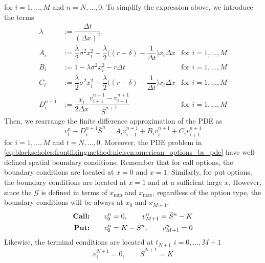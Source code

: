 for $i = 1, \dots, M$ and $n = N, \dots, 0$. To simplify the expression above, we introduce the terms 
\begin{align*}
  \lambda &:= \dfrac{\Delta{t}}{(\Delta{x})^2} \\
  A_i &:= \dfrac{\lambda}{2}\sigma^2x^{2}_i - \dfrac{\lambda}{2}\bigg((r-\delta) - \dfrac{1}{\Delta{t}}\bigg)x_i\Delta{x} & \text{for $i = 1, \dots, M$} \\ 
  B_i &:= 1 - \lambda\sigma^2x_i^2 - r\Delta{t} & \text{for $i = 1, \dots, M$} \\
  C_i &:= \dfrac{\lambda}{2}\sigma^2x^{2}_i + \dfrac{\lambda}{2}\bigg((r-\delta) - \dfrac{1}{\Delta{t}}\bigg)x_i\Delta{x} &  \text{for $i = 1, \dots, M$} \\
  D^{n+1}_{i} &:= \dfrac{x_i}{2\Delta{x}}\dfrac{v^{n+1}_{i+1} - v^{n+1}_{i-1}}{\bar{S}^{n+1}} &  \text{for $i = 1, \dots, M$}
\end{align*}
Then, we rearrange the finite difference approximation of the PDE as 
\begin{equation}
  v^{n}_{i} - D^{n+1}_{i}\bar{S}^n = A_i v^{n+1}_{i-1} + B_{i}v^{n+1}_{i} + C_{i}v^{n+1}_{i+1}
  \label{eq:finitedifferencesschemes:explicit:pde_simplified}
\end{equation}
for $i = 1, \dots, M$ and $t = N, \dots, 0$. Moreover, the PDE problem in \eqref{eq:blackscholes:frontfixingmethod:nielsen:american_options_bs_pde} have well-defined spatial boundary conditions. Remember that for call options, the boundary conditions are located at $x=0$ and $x=1$. Similarly, for put options, the boundary conditions are located at $x=1$ and at a sufficient large $x$. However, since the $\mathcal{G}$ is defined in terms of $x_\text{min}$ and $x_\text{max}$, regardless of the option type, the boundary conditions will be always at $x_0$ and $x_{M+1}$.
\begin{subequations}
  \label{eq:finitedifferencesschemes:explicit:boundary_conditions}
  \begin{align}
    \text{\textbf{Call:}} \qquad & v^{n}_{0} = 0, \qquad v^{n}_{M+1} = \bar{S}^{n} - K\\
    \text{\textbf{Put:}} \qquad & v^{n}_{0} = K - \bar{S}^{n}, \qquad v^{n}_{M+1} = 0
  \end{align}
\end{subequations}
Likewise, the terminal conditions are located at $t_{N+1}$ $i=0,\dots,M+1$
\begin{subequations}
  \label{eq:finitedifferencesschemes:explicit:terminal_conditions}
  \begin{equation}
    v^{N+1}_{i} = 0, \qquad \bar{S}^{N+1} = K
  \end{equation}
\end{subequations}
